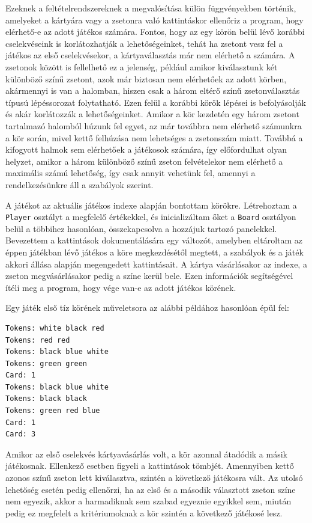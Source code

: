 Ezeknek a feltételrendszereknek a megvalósítása külön függvényekben történik, amelyeket a kártyára vagy a zsetonra való kattintáskor ellenőriz a program, hogy elérhető-e az adott játékos számára. Fontos, hogy az egy körön belül lévő korábbi cselekvéseink is korlátozhatják a lehetőségeinket, tehát ha zsetont vesz fel a játékos az első cselekvésekor, a kártyaválasztás már nem elérhető a számára. A zsetonok között is fellelhető ez a jelenség, például amikor kiválasztunk két különböző színű zsetont, azok már biztosan nem elérhetőek az adott körben, akármennyi is van a halomban, hiszen csak a három eltérő színű zsetonválasztás típusú lépéssorozat folytatható. Ezen felül a korábbi körök lépései is befolyásolják és akár korlátozzák a lehetőségeinket. Amikor a kör kezdetén egy három zsetont tartalmazó halomból húzunk fel egyet, az már továbbra nem elérhető számunkra a kör során, mivel kettő felhúzása nem lehetséges a zsetonszám miatt. Továbbá a kifogyott halmok sem elérhetőek a játékosok számára, így előfordulhat olyan helyzet, amikor a három különböző színű zseton felvételekor nem elérhető a maximális számú lehetőség, így csak annyit vehetünk fel, amennyi a rendelkezésünkre áll a szabályok szerint.


A játékot az aktuális játékos indexe alapján bontottam körökre. Létrehoztam a \texttt{Player} osztályt a megfelelő értékekkel, és inicializáltam őket a \texttt{Board} osztályon belül a többihez hasonlóan, összekapcsolva a hozzájuk tartozó panelekkel. Bevezettem a kattintások dokumentálására egy változót, amelyben eltároltam az éppen játékban lévő játékos a köre megkezdésétől megtett, a szabályok és a játék akkori állása alapján megengedett kattintásait. A kártya vásárlásakor az indexe, a zseton megvásárlásakor pedig a színe kerül bele. Ezen információk segítségével ítéli meg a program, hogy vége van-e az adott játékos körének.

Egy játék első tíz körének műveletsora az alábbi példához hasonlóan épül fel:
\begin{verbatim}
Tokens: white black red 
Tokens: red red 
Tokens: black blue white 
Tokens: green green 
Card: 1 
Tokens: black blue white 
Tokens: black black 
Tokens: green red blue 
Card: 1 
Card: 3 
\end{verbatim}

Amikor az első cselekvés kártyavásárlás volt, a kör azonnal átadódik a másik játékosnak. Ellenkező esetben figyeli a kattintások tömbjét. Amennyiben kettő azonos színű zseton lett kiválasztva, szintén a következő játékosra vált. Az utolsó lehetőség esetén pedig ellenőrzi, ha az első és a második választott zseton színe nem egyezik, akkor a harmadiknak sem szabad egyeznie egyikkel sem, miután pedig ez megfelelt a kritériumoknak a kör szintén a következő játékosé lesz.

